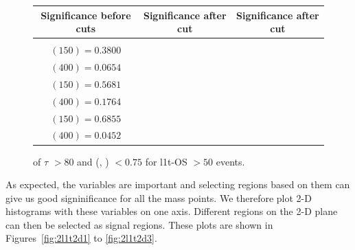 \documentclass[letterpaper,12pt]{article}
\begin{document}
\begin{figure}[h!]
{  }
  \makebox[\textwidth][c]{%
    \rule{0pt}{0.6cm}
    }
  \tiny
  \setlength{\tabcolsep}{20pt}
  \renewcommand{\arraystretch}{1.6}
  \begin{tabular}{|c|c|c|}
    \hline
    Significance before cuts & Significance after \pt{} cut & Significance after \dphi{} cut\\
    \hline
    \Gape[0.2cm]{\makecell{
        \sig{} $(100) = 0.2990$\\
        \sig{} $(150) = 0.3800$\\
        \sig{} $(400) = 0.0654$ }} & 
    \makecell{
      \sig{} $(100) = 0.2305$\\
      \sig{} $(150) = 0.5681$\\
      \sig{} $(400) = 0.1764$} & 
    \makecell{
      \sig{} $(100) = 0.4426$\\
      \sig{} $(150) = 0.6855$\\
      \sig{} $(400) = 0.0452$}\\
    \hline
  \end{tabular}
  \caption[\2l1t-OS Cut-5: \pt{} of $\tau$ $>80$ + \dphi{} (\ll, \ls) $< 0.75$]{\pt{} of $\tau$ $>80$ and \dphi{} (\ll, \ls) $< 0.75$ for \2l1t-OS \metpt $>50$ events.}
  \label{fig:2l1tc5}
\end{figure}
\vspace{1.5cm}

As expected, the \DeltaR{} variables are important and selecting regions based on them can give us good signinificance for all the mass points. We therefore plot 2-D histograms with these variables on one axis. Different regions on the 2-D plane can then be selected as signal regions. These plots are shown in Figures~\ref{fig:2l1t2d1} to \ref{fig:2l1t2d3}.
\end{document}
